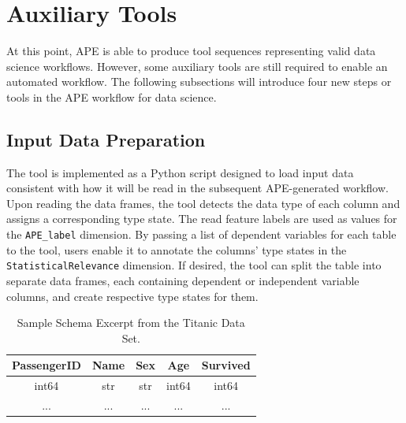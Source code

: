 \section{Auxiliary Tools}
At this point, APE is able to produce tool sequences representing valid data science workflows. However, some auxiliary tools are still required to enable an automated workflow. The following subsections will introduce four new steps or tools in the APE workflow for data science.

\subsection{Input Data Preparation}
The tool is implemented as a Python script designed to load input data consistent with how it will be read in the subsequent APE-generated workflow. Upon reading the data frames, the tool detects the data type of each column and assigns a corresponding type state. The read feature labels are used as values for the \verb|APE_label| dimension. By passing a list of dependent variables for each table to the tool, users enable it to annotate the columns' type states in the \verb|StatisticalRelevance| dimension. If desired, the tool can split the table into separate data frames, each containing dependent or independent variable columns, and create respective type states for them.

\begin{table}[h]
\centering
\begin{tabular}{|c|c|c|c|c|}
\hline
PassengerID & Name & Sex & Age & Survived \\
\hline
int64 & str & str & int64 & int64 \\
\hline\hline
... & ... & ... & ... & ... \\
\hline
\end{tabular}
\caption{Sample Schema Excerpt from the Titanic Data Set.}
\label{table:native_ape_data_prep_sample_table}
\end{table}

